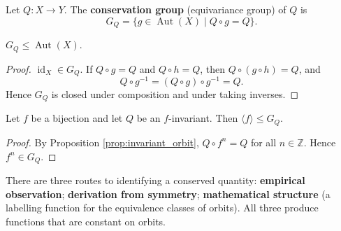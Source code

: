 \begin{definition}\label{def:conservation_group}
Let $Q:X\to Y$. The \textbf{conservation group} (equivariance group) of $Q$ is
\[
G_Q=\{g\in\operatorname{Aut}(X)\mid Q\circ g=Q\}.
\]
\end{definition}

\begin{property}\label{prop:conservation_group_is_group}
$G_Q\le\operatorname{Aut}(X)$.
\end{property}

\begin{proof}
$\operatorname{id}_X\in G_Q$. If $Q\circ g=Q$ and $Q\circ h=Q$, then $Q\circ(g\circ h)=Q$, and
\[
Q\circ g^{-1}=(Q\circ g)\circ g^{-1}=Q.
\]
Hence $G_Q$ is closed under composition and under taking inverses.
\end{proof}

\begin{proposition}\label{prop:f_in_GQ}
Let $f$ be a bijection and let $Q$ be an $f$-invariant. Then $\langle f\rangle\le G_Q$.
\end{proposition}

\begin{proof}
By Proposition \ref{prop:invariant_orbit}, $Q\circ f^n=Q$ for all $n\in\mathbb{Z}$. Hence $f^n\in G_Q$.
\end{proof}

\begin{remark}\label{rem:conservation_source}
There are three routes to identifying a conserved quantity: \textbf{empirical observation}; \textbf{derivation from symmetry}; \textbf{mathematical structure} (a labelling function for the equivalence classes of orbits). All three produce functions that are constant on orbits.
\end{remark}

